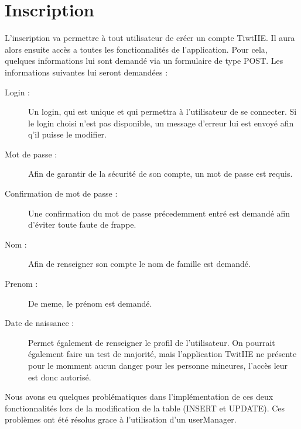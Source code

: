\documentclass[a4paper, 12pt]{article}
\begin{document}
\section{Inscription}
L'inscription va permettre à tout utilisateur de créer un compte TiwtIIE. Il aura alors ensuite accès a toutes les fonctionnalités de l'application.
Pour cela, quelques informations lui sont demandé via un formulaire de type POST. Les informations suivantes lui seront demandées : 
\begin{description}
\item[Login :] Un login, qui est unique et qui permettra à l'utilisateur de se connecter. Si le login choisi n'est pas disponible, un message d'erreur lui est envoyé afin q'il puisse le modifier.
\item[Mot de passe :] Afin de garantir de la sécurité de son compte, un mot de passe est requis.
\item[Confirmation de mot de passe :] Une confirmation du mot de passe précedemment entré est demandé afin d'éviter toute faute de frappe.
\item[Nom :] Afin de renseigner son compte le nom de famille est demandé.
\item[Prenom :] De meme, le prénom est demandé.
\item[Date de naissance :] Permet également de renseigner le profil de l'utilisateur. On pourrait également faire un test de majorité, mais l'application TwitIIE ne présente pour le momment aucun danger pour les personne mineures, l'accès leur est donc autorisé.
\end{description}

Nous avons eu quelques problématiques dans l'implémentation de ces deux fonctionnalités lors de la modification de la table (INSERT et UPDATE). Ces problèmes ont été résolus grace à l'utilisation d'un userManager. 
\end{document}
